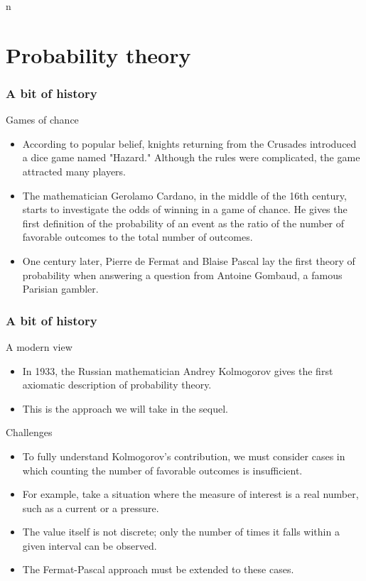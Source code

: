 n\section{Probability theory}

\begin{frame}
    \frametitle{A bit of history}
\begin{block}{Games of chance}
    \begin{itemize}
        \item<+-> According to popular belief, knights returning from the Crusades introduced a dice game named "Hazard."
         Although the rules were complicated, the game attracted many players.
        \item<+-> The mathematician Gerolamo Cardano, in the middle of the 16th century, starts to investigate the odds of winning
        in a game of chance. He gives the first definition of the probability of an event as the ratio of
        the number of favorable outcomes to the total number of outcomes.
        \item<+-> One century later, Pierre de Fermat and Blaise Pascal lay the first theory of probability when
        answering a question from Antoine Gombaud, a famous Parisian gambler.
    \end{itemize}
\end{block}
\end{frame}
\begin{frame}
    \frametitle{A bit of history}
\begin{block}{A modern view}
    \begin{itemize}
        \item<+-> In 1933, the Russian mathematician Andrey Kolmogorov gives the first axiomatic description of probability theory.
        \item<+-> This is the approach we will take in the sequel.
    \end{itemize}
\end{block}    
\begin{block}{Challenges}
    \begin{itemize}
       \item<+-> To fully understand Kolmogorov's contribution, we must consider cases in which counting the number of favorable outcomes is insufficient.
       \item<+-> For example, take a situation where the measure of interest is a real number, such as a current or a pressure.
       \item<+-> The value itself is not discrete; only the number of times it falls within a given interval can be observed.
       \item<+-> The Fermat-Pascal approach must be extended to these cases.
    \end{itemize}
\end{block}    
\end{frame}
